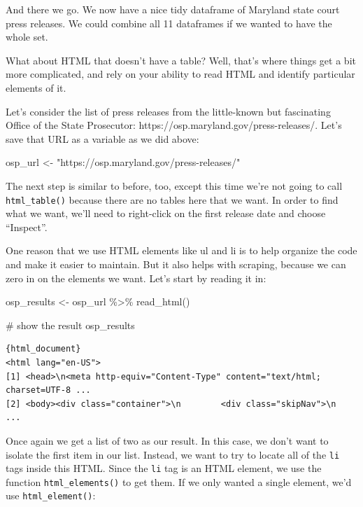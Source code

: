 \documentclass[
  letterpaper,
  DIV=11,
  numbers=noendperiod]{scrreprt}
\newenvironment{Shaded}{\begin{snugshade}}{\end{snugshade}}
\newcommand{\CommentTok}[1]{\textcolor[rgb]{0.37,0.37,0.37}{#1}}
\newcommand{\FunctionTok}[1]{\textcolor[rgb]{0.28,0.35,0.67}{#1}}
\newcommand{\NormalTok}[1]{\textcolor[rgb]{0.00,0.23,0.31}{#1}}
\newcommand{\OtherTok}[1]{\textcolor[rgb]{0.00,0.23,0.31}{#1}}
\newcommand{\SpecialCharTok}[1]{\textcolor[rgb]{0.37,0.37,0.37}{#1}}
\newcommand{\StringTok}[1]{\textcolor[rgb]{0.13,0.47,0.30}{#1}}
\begin{document}
And there we go. We now have a nice tidy dataframe of Maryland state
court press releases. We could combine all 11 dataframes if we wanted to
have the whole set.

What about HTML that doesn't have a table? Well, that's where things get
a bit more complicated, and rely on your ability to read HTML and
identify particular elements of it.

Let's consider the list of press releases from the little-known but
fascinating Office of the State Prosecutor:
https://osp.maryland.gov/press-releases/. Let's save that URL as a
variable as we did above:

\begin{Shaded}
\begin{Highlighting}[]
\NormalTok{osp\_url }\OtherTok{\textless{}{-}} \StringTok{"https://osp.maryland.gov/press{-}releases/"}
\end{Highlighting}
\end{Shaded}

The next step is similar to before, too, except this time we're not
going to call \texttt{html\_table()} because there are no tables here
that we want. In order to find what we want, we'll need to right-click
on the first release date and choose ``Inspect''.

One reason that we use HTML elements like ul and li is to help organize
the code and make it easier to maintain. But it also helps with
scraping, because we can zero in on the elements we want. Let's start by
reading it in:

\begin{Shaded}
\begin{Highlighting}[]
\NormalTok{osp\_results }\OtherTok{\textless{}{-}}\NormalTok{ osp\_url }\SpecialCharTok{\%\textgreater{}\%}
  \FunctionTok{read\_html}\NormalTok{()}

\CommentTok{\# show the result}
\NormalTok{osp\_results}
\end{Highlighting}
\end{Shaded}

\begin{verbatim}
{html_document}
<html lang="en-US">
[1] <head>\n<meta http-equiv="Content-Type" content="text/html; charset=UTF-8 ...
[2] <body><div class="container">\n        <div class="skipNav">\n            ...
\end{verbatim}

Once again we get a list of two as our result. In this case, we don't
want to isolate the first item in our list. Instead, we want to try to
locate all of the \texttt{li} tags inside this HTML. Since the
\texttt{li} tag is an HTML element, we use the function
\texttt{html\_elements()} to get them. If we only wanted a single
element, we'd use \texttt{html\_element()}:
\end{document}
